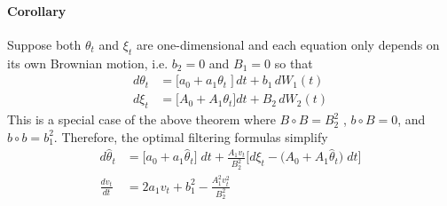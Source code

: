 \documentclass[12pt]{article}
\theoremstyle{plain}
\theoremstyle{definition}
\theoremstyle{remark}
\begin{document}
\clearpage
\paragraph{Corollary}
Suppose both $\theta_t$ and $\xi_t$ are one-dimensional and each
equation only depends on its own Brownian motion, i.e. $b_2=0$ and
$B_1=0$ so that
\begin{align*}
  d\theta_t &= \big[a_0+a_1\theta_t\;\big]\,dt + b_1\,dW_1(t)
  \\
  d\xi_t &= \big[A_0 + A_1\theta_t\big]dt + B_2\,dW_2(t)
\end{align*}
This is a special case of the above theorem where
$B \circ B = B_2^2$ , $b\circ B = 0$, and $b\circ b = b_1^2$.
Therefore, the optimal filtering formulas simplify
\begin{align*}
  d\hat{\theta}_t &=
  \big[
  a_0 + a_1\hat{\theta}_t
  \big]\;dt
  +
  \frac{A_1v_t}{B_2^2}
  \big[
    d\xi_t - \big(A_0+A_1\hat{\theta}_t\big)\;dt
  \big]
  \\
  \frac{dv_t}{dt}
  &=
  2a_1v_t
  + b_1^2
  -
  \frac{A_1^2v_t^2}{B_2^2}
\end{align*}
\end{document}
